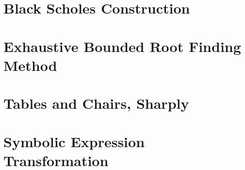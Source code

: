 \documentclass[12pt,letterpaper,oneside]{book}
\theoremstyle{plain}
\theoremstyle{definition}
\theoremstyle{remark}
\numberwithin{theorem}{chapter}
\begin{document}
\chapter{Black Scholes Construction}



\appendix
\chapter{Exhaustive Bounded Root Finding Method}

%
\chapter{Tables and Chairs, Sharply}

\chapter{Symbolic Expression Transformation}





\end{document}
